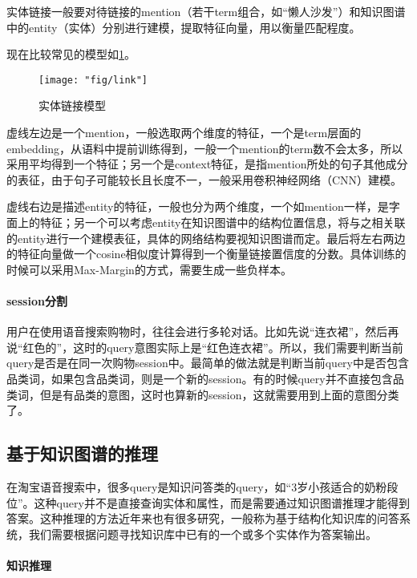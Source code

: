 实体链接一般要对待链接的mention（若干term组合，如“懒人沙发”）和知识图谱中的entity（实体）分别进行建模，提取特征向量，用以衡量匹配程度。

现在比较常见的模型如\ref{fig:link}。

\begin{figure}[th]
	\centering
	\texttt{[image: "fig/link"]}
	\caption{实体链接模型}
	\label{fig:link}
\end{figure}

虚线左边是一个mention，一般选取两个维度的特征，一个是term层面的embedding，从语料中提前训练得到，一般一个mention的term数不会太多，所以采用平均得到一个特征；另一个是context特征，是指mention所处的句子其他成分的表征，由于句子可能较长且长度不一，一般采用卷积神经网络（CNN）建模。

虚线右边是描述entity的特征，一般也分为两个维度，一个如mention一样，是字面上的特征；另一个可以考虑entity在知识图谱中的结构位置信息，将与之相关联的entity进行一个建模表征，具体的网络结构要视知识图谱而定。最后将左右两边的特征向量做一个cosine相似度计算得到一个衡量链接置信度的分数。具体训练的时候可以采用Max-Margin的方式，需要生成一些负样本。

\paragraph{session分割}

用户在使用语音搜索购物时，往往会进行多轮对话。比如先说“连衣裙”，然后再说“红色的”，这时的query意图实际上是“红色连衣裙”。所以，我们需要判断当前query是否是在同一次购物session中。最简单的做法就是判断当前query中是否包含品类词，如果包含品类词，则是一个新的session。有的时候query并不直接包含品类词，但是有品类的意图，这时也算新的session，这就需要用到上面的意图分类了。


\subsection{基于知识图谱的推理}

在淘宝语音搜索中，很多query是知识问答类的query，如“3岁小孩适合的奶粉段位”。这种query并不是直接查询实体和属性，而是需要通过知识图谱推理才能得到答案。这种推理的方法近年来也有很多研究，一般称为基于结构化知识库的问答系统，我们需要根据问题寻找知识库中已有的一个或多个实体作为答案输出。

\paragraph{知识推理}

